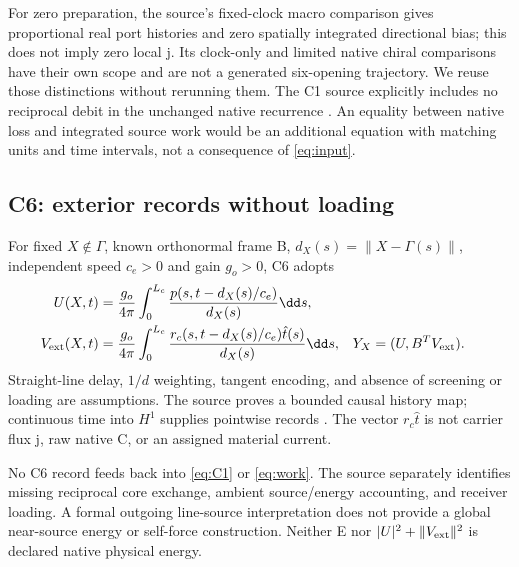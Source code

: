 For zero preparation, the source's fixed-clock macro comparison gives proportional real port histories and zero spatially integrated directional bias; this does not imply zero local j. Its clock-only and limited native chiral comparisons have their own scope and are not a generated six-opening trajectory. We reuse those distinctions without rerunning them. The C1 source explicitly includes no reciprocal debit in the unchanged native recurrence \cite[carrier and conclusion]{pairedII}. An equality between native loss and integrated source work would be an additional equation with matching units and time intervals, not a consequence of \eqref{eq:input}.

\subsection{C6: exterior records without loading}
For fixed $X\notin\Gamma$, known orthonormal frame B, $d_X(s)=\|X-\Gamma(s)\|$, independent speed $c_e>0$ and gain $g_o>0$, C6 adopts
\begin{align}
 U(X,t)&=\frac{g_o}{4\pi}\int_0^{L_c}\frac{p(s,t-d_X(s)/c_e)}{d_X(s)}\dd s,\notag\\
 V_{\rm ext}(X,t)&=\frac{g_o}{4\pi}\int_0^{L_c}
       \frac{r_c(s,t-d_X(s)/c_e)\hat t(s)}{d_X(s)}\dd s,
 &Y_X&=(U,B^TV_{\rm ext}).\label{eq:C6}
\end{align}
Straight-line delay, $1/d$ weighting, tangent encoding, and absence of screening or loading are assumptions. The source proves a bounded causal history map; continuous time into $H^1$ supplies pointwise records \cite[exterior section]{pairedII}. The vector $r_c\hat t$ is not carrier flux j, raw native C, or an assigned material current.

No C6 record feeds back into \eqref{eq:C1} or \eqref{eq:work}. The source separately identifies missing reciprocal core exchange, ambient source/energy accounting, and receiver loading. A formal outgoing line-source interpretation does not provide a global near-source energy or self-force construction. Neither E nor $|U|^2+\|V_{\rm ext}\|^2$ is declared native physical energy.
